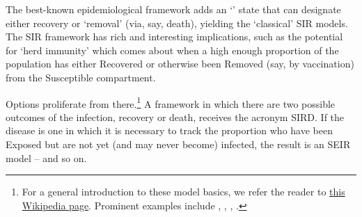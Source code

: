The best-known epidemiological framework adds an `\Recovered' state that can designate either recovery or `removal' (via, say, death), yielding the `classical' SIR models.
The SIR framework has rich and interesting implications, such as the potential for `herd immunity' which comes about when a high enough proportion of the population has either Recovered or otherwise been Removed (say, by vaccination) from the Susceptible compartment.


Options proliferate from there.\footnote{For a general introduction to these model basics, we refer the reader to \href{https://en.wikipedia.org/wiki/Compartmental_models_in_epidemiology\#Transition_rates}{this Wikipedia page}.  Prominent examples include	 , , , .}  A framework in which there are two possible outcomes of the infection, recovery or death, receives the acronym SIRD.  If the disease is one in which it is necessary to track the proportion who have been Exposed but are not yet (and may never become) infected, the result is an SEIR model -- and so on.


